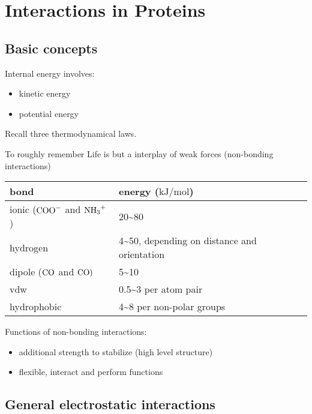 \chapter{Interactions in Proteins}

\begin{introduction}
    \item 
\end{introduction}

\hypertarget{basic-concepts}{%
	\section{Basic concepts}\label{basic-concepts}}

Internal energy involves:

\begin{itemize}
	\item
	kinetic energy
	\item
	potential energy
\end{itemize}

Recall three thermodynamical laws.

\begin{emptytcb*}{To roughly remember}{}
	Life is but a interplay of weak forces (non-bonding interactions)
	\begin{longtable}[]{@{}ll@{}}
		\toprule
		bond & energy (\(\mathrm{kJ/mol}\))\tabularnewline
		\midrule
		\endhead
		ionic (\(\ce{COO-}\) and \(\ce{NH3+}\)) &
		20\textasciitilde{}80\tabularnewline
		hydrogen & 4\textasciitilde{}50, depending on distance and
		orientation\tabularnewline
		dipole (\(\ce{CO}\) and \(\ce{CO)}\) & 5\textasciitilde{}10\tabularnewline
		vdw & 0.5\textasciitilde{}3 per atom pair\tabularnewline
		hydrophobic & 4\textasciitilde{}8 per non-polar groups\tabularnewline
		\bottomrule
	\end{longtable}
	
	Functions of non-bonding interactions:
	
	\begin{itemize}
		\item
		additional strength to stabilize (high level structure)
		\item
		flexible, interact and perform functions
	\end{itemize}
\end{emptytcb*}

\hypertarget{general-electrostatic-interactions}{%
	\section{General electrostatic
		interactions}\label{general-electrostatic-interactions}}

